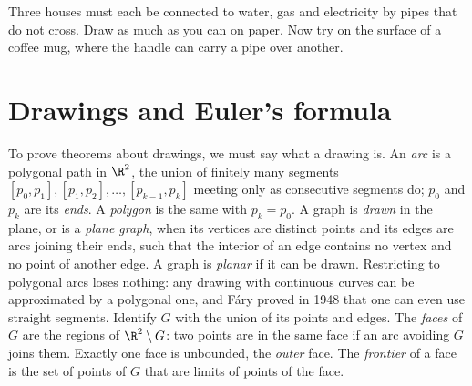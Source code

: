 \begin{think}
Three houses must each be connected to water, gas and electricity by pipes that do not cross. Draw as much as you can on
paper. Now try on the surface of a coffee mug, where the handle can carry a pipe over another.
\end{think}

\section{Drawings and Euler's formula}

To prove theorems about drawings, we must say what a drawing is. An \emph{arc} is a polygonal path in $\R^2$, the union of finitely many
segments $[p_0,p_1],[p_1,p_2],\dots,[p_{k-1},p_k]$ meeting only as consecutive segments do; $p_0$ and $p_k$ are its \emph{ends}. A \emph{polygon} is the same with
$p_k=p_0$. A graph is \emph{drawn} in the plane, or is a \emph{plane graph}, when its vertices are distinct points and its edges are arcs joining their
ends, such that the interior of an edge contains no vertex and no point of another edge. A graph is \emph{planar} if it can be drawn.
Restricting to polygonal arcs loses nothing: any drawing with continuous curves can be approximated by a polygonal one, and
F\'ary proved in 1948 that one can even use straight segments. Identify $G$ with the union of its
points and edges. The \emph{faces} of $G$ are the regions of $\R^2\setminus G$: two points are in the same face if an arc avoiding $G$ joins them.
Exactly one face is unbounded, the \emph{outer} face. The \emph{frontier} of a face is the set of points of $G$ that are limits of points of the face.

